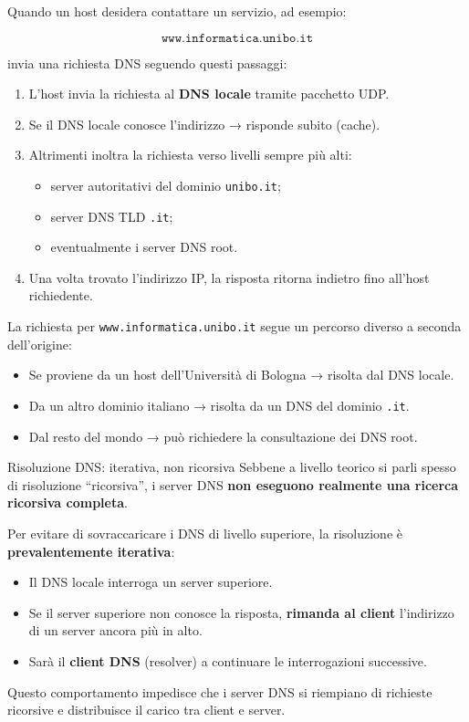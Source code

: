 \documentclass[a4paper,12pt]{report}
\begin{document}
Quando un host desidera contattare un servizio, ad esempio:

\[
\texttt{www.informatica.unibo.it}
\]

invia una richiesta DNS seguendo questi passaggi:

\begin{enumerate}
    \item L’host invia la richiesta al \textbf{DNS locale} tramite pacchetto UDP.
    \item Se il DNS locale conosce l’indirizzo → risponde subito (cache).
    \item Altrimenti inoltra la richiesta verso livelli sempre più alti:
    \begin{itemize}
        \item server autoritativi del dominio \texttt{unibo.it};
        \item server DNS TLD \texttt{.it};
        \item eventualmente i server DNS root.
    \end{itemize}
    \item Una volta trovato l’indirizzo IP, la risposta ritorna indietro fino all’host richiedente.
\end{enumerate}

\begin{esempiobox}{}
La richiesta per \texttt{www.informatica.unibo.it} segue un percorso diverso a seconda dell’origine:
\begin{itemize}
    \item Se proviene da un host dell’Università di Bologna → risolta dal DNS locale.
    \item Da un altro dominio italiano → risolta da un DNS del dominio \texttt{.it}.
    \item Dal resto del mondo → può richiedere la consultazione dei DNS root.
\end{itemize}
\end{esempiobox}

\begin{notebox}{Risoluzione DNS: iterativa, non ricorsiva}
Sebbene a livello teorico si parli spesso di risoluzione ``ricorsiva'',  
i server DNS \textbf{non eseguono realmente una ricerca ricorsiva completa}.  

Per evitare di sovraccaricare i DNS di livello superiore, la risoluzione è 
\textbf{prevalentemente iterativa}:

\begin{itemize}
    \item Il DNS locale interroga un server superiore.
    \item Se il server superiore non conosce la risposta, \textbf{rimanda al client}  
          l’indirizzo di un server ancora più in alto.
    \item Sarà il \textbf{client DNS} (resolver) a continuare le interrogazioni successive.
\end{itemize}

Questo comportamento impedisce che i server DNS si riempiano di richieste ricorsive
e distribuisce il carico tra client e server.
\end{notebox}
\end{document}
